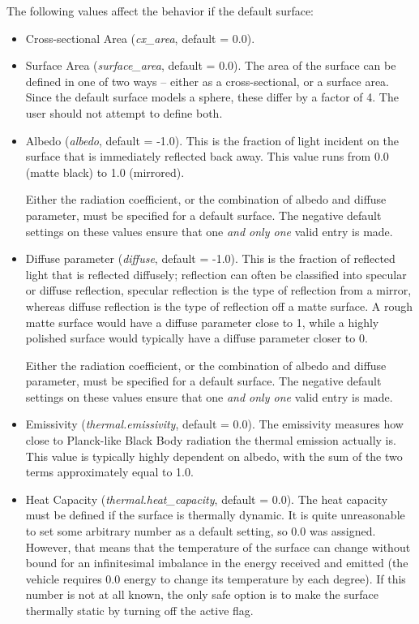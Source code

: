 The following values affect the behavior if the default surface:
\begin{itemize}
\item{Cross-sectional Area (\textit{cx\_area}, default = 0.0)}.
\item{Surface Area (\textit{surface\_area}, default = 0.0)}. \newline
The area of the surface can be defined in one of two ways -- either as a cross-sectional, or a surface area.  Since the default surface models a sphere, these differ by a factor of 4.  The user should not attempt to define both.

\item {Albedo (\textit{albedo}, default = -1.0)}. \newline
This is the fraction of light incident on the surface that is immediately reflected back away.  This value runs from 0.0 (matte black) to 1.0 (mirrored).

Either the radiation coefficient, or the combination of albedo and diffuse
parameter, must be specified for a default surface.  The negative default
settings on these values ensure that one \textit{and only one} valid entry is
made.

\item {Diffuse parameter (\textit{diffuse}, default = -1.0)}.\newline
This is the fraction of reflected light that is reflected diffusely; reflection can often be classified into specular or diffuse reflection, specular reflection is the type of reflection from a mirror, whereas diffuse reflection is the type of reflection off a matte surface.  A rough matte surface would have a diffuse parameter close to 1, while a highly polished surface would typically have a diffuse parameter closer to 0.

Either the radiation coefficient, or the combination of albedo and diffuse
parameter, must be specified for a default surface.  The negative default
settings on these values ensure that one \textit{and only one} valid entry is
made.

\item{Emissivity (\textit{thermal.emissivity}, default = 0.0)}. \newline
The emissivity measures how close to Planck-like Black Body radiation the thermal emission actually is.  This value is typically highly dependent on albedo, with the sum of the two terms approximately equal to 1.0.

\item {Heat Capacity (\textit{thermal.heat\_capacity}, default = 0.0)}.\newline
The heat capacity must be defined if the surface is thermally dynamic.  It is quite unreasonable to set some arbitrary number as a default setting, so 0.0 was assigned.  However, that means that the temperature of the surface can change without bound for an infinitesimal imbalance in the energy received and emitted (the vehicle requires 0.0 energy to change its temperature by each degree).  If this number is not at all known, the only safe option is to make the surface thermally static by turning off the active flag.


\end{itemize}

